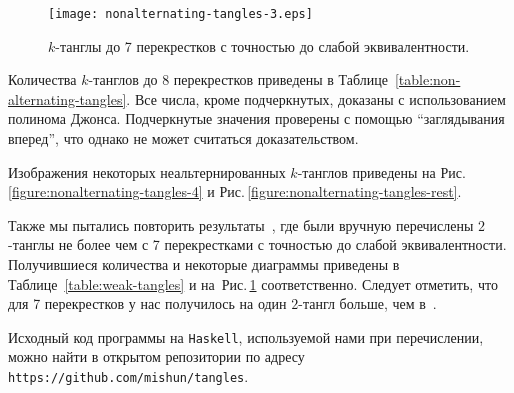 \documentclass[12pt]{article}
\theoremstyle{plain}
\theoremstyle{definition}
\def\figureref#1{Рис.\,\protect\ref{#1}}
\begin{document}
		\begin{figure}[ht]
			\centering
			\texttt{[image: nonalternating-tangles-3.eps]}
			\caption{\footnotesize $k$-танглы до 7 перекрестков с точностью до слабой эквивалентности.\label{figure:weak-tangles-7}}
		\end{figure}

		Количества $k$-танглов до 8 перекрестков приведены в Таблице~\ref{table:non-alternating-tangles}. Все числа, кроме подчеркнутых,
		доказаны с использованием полинома Джонса. Подчеркнутые значения проверены с помощью ``заглядывания вперед'', что однако не
		может считаться доказательством.

		Изображения некоторых неальтернированных $k$-танглов приведены на \figureref{figure:nonalternating-tangles-4} и
		\figureref{figure:nonalternating-tangles-rest}.

		Также мы пытались повторить результаты~\cite{KanenobuSaitoSatoh2003}, где были вручную перечислены $2$-танглы не более чем
		с 7 перекрестками с точностью до слабой эквивалентности. Получившиеся количества и некоторые диаграммы приведены в
		Таблице~\ref{table:weak-tangles} и на~\figureref{figure:weak-tangles-7} соответственно. Следует отметить, что для 7
		перекрестков у нас получилось на один $2$-тангл больше, чем в~\cite{KanenobuSaitoSatoh2003}.

		Исходный код программы на \texttt{Haskell}, используемой нами при перечислении, можно найти в открытом репозитории по
		адресу \texttt{https://github.com/mishun/tangles}.
\end{document}

